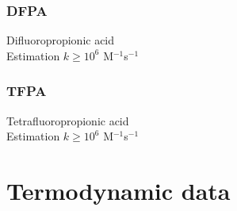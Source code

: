 
\subsubsection{DFPA} %
\label{ssub:dfpa}

Difluoropropionic acid \\
Estimation $k \ge 10^6$ M$^{-1}$s$^{-1}$ \\




\subsubsection{TFPA} %
\label{ssub:tfpa}

Tetrafluoropropionic acid \\
Estimation $k \ge 10^6$ M$^{-1}$s$^{-1}$ \\










\section{Termodynamic data} %
\label{sec:termodynamic_data}







